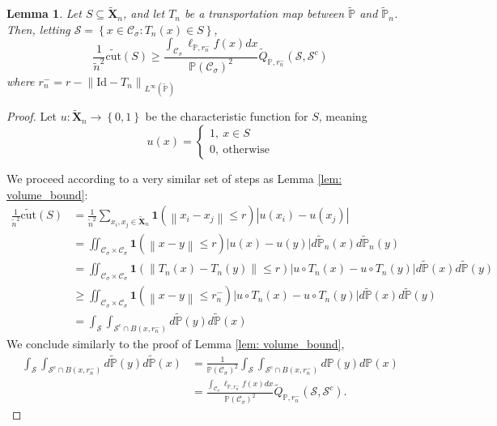 \documentclass{article}
\newcommand{\norm}[1]{\left\lVert#1\right\rVert}
\newcommand{\abs}[1]{\left \lvert #1 \right \rvert}
\newcommand{\set}[1]{\left\{#1\right\}}
\newcommand{\Xbf}{\mathbf{X}}
\newcommand{\Cset}{\mathcal{C}}
\newcommand{\Sset}{\mathcal{S}}
\newcommand{\Csig}{\Cset_{\sigma}}
\newcommand{\Pbb}{\mathbb{P}}
\newcommand{\1}{\mathbf{1}}
\newcommand{\cut}{\mathrm{cut}}
\theoremstyle{alden}
\theoremstyle{aldenthm}
\newtheorem{lemma}{Lemma}
\theoremstyle{remark}
\begin{document}
\begin{lemma}
	\label{lem: cut_bound}
	Let $S \subseteq \widetilde{\Xbf}_n$, and let $T_n$ be a transportation map between $\widetilde{\Pbb}$ and $\widetilde{\Pbb}_n$. Then, letting $\Sset = \set{x \in \Csig: T_n(x) \in S}$,
	\begin{equation*}
	\frac{1}{\widetilde{n}^2} \widetilde{\cut}(S) \geq \frac{\int_{\Csig} \ell_{\Pbb,r_n^-}f(x) dx}{\Pbb(\Csig)^2} \widetilde{Q}_{\Pbb,r_n^-}(\Sset, \Sset^c) 
	\end{equation*}
	where $r_n^- = r - \norm{\mathrm{Id} - T_n}_{L^\infty(\widetilde{\Pbb})}$
\end{lemma}
\begin{proof}
	Let $u: \widetilde{\Xbf}_n \to \set{0,1}$ be the characteristic function for $S$, meaning
	\begin{equation*}
	u(x) = 
	\begin{cases}
	1,~ x \in S \\
	0,~ \text{otherwise}
	\end{cases}
	\end{equation*}
	
	We proceed according to a very similar set of steps as Lemma \ref{lem: volume_bound}:
	\begin{align*}
	\frac{1}{\widetilde{n}^2} \widetilde{\cut}(S) & = \frac{1}{\widetilde{n}^2} \sum_{x_i, x_j \in \widetilde{\Xbf}_n} \1(\norm{x_i - x_j} \leq r) \abs{u(x_i) - u(x_j)} \\
	& = \iint_{\Csig \times \Csig} \1(\norm{x - y} \leq r) \abs{u(x) - u(y)} d\widetilde{\Pbb}_n(x) d\widetilde{\Pbb}_n(y) \\
	& =  \iint_{\Csig \times \Csig} \1(\norm{T_n(x) - T_n(y)} \leq r) \abs{u \circ T_n(x) - u \circ T_n(y)} d\widetilde{\Pbb}(x) d\widetilde{\Pbb}(y) \\
	& \geq \iint_{\Csig \times \Csig} \1(\norm{x - y} \leq r_n^-) \abs{u \circ T_n(x) - u \circ T_n(y)} d\widetilde{\Pbb}(x) d\widetilde{\Pbb}(y) \\
	& = \int_{\Sset} \int_{\Sset^c \cap B(x,r_n^-)} d\widetilde{\Pbb}(y) d\widetilde{\Pbb}(x)
	\end{align*}
	We conclude similarly to the proof of Lemma \ref{lem: volume_bound},
	\begin{align*}
	\int_{\Sset} \int_{\Sset^c \cap B(x,r_n^-)} d\widetilde{\Pbb}(y) d\widetilde{\Pbb}(x) & = \frac{1}{\Pbb(\Csig)^2} \int_{\Sset} \int_{\Sset^c \cap B(x,r_n^-)} d\Pbb(y) d\Pbb(x) \\
	& = \frac{\int_{\Csig} \ell_{\Pbb,r_n^-}f(x) dx}{\Pbb(\Csig)^2} \widetilde{Q}_{\Pbb,r_n^-}(\Sset, \Sset^c).
	\end{align*}	
\end{proof}
\end{document}
